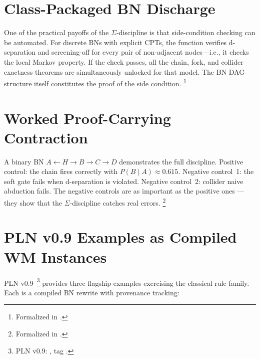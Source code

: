 \documentclass[11pt,openany]{report}
\begin{document}


\section{Class-Packaged BN Discharge}

One of the practical payoffs of the $\Sigma$-discipline is that
side-condition checking can be automated.  For discrete BNs with
explicit CPTs, the function
 verifies d-separation and
screening-off for every pair of non-adjacent nodes---i.e., it
checks the local Markov property.  If the check passes, all the
chain, fork, and collider exactness theorems are simultaneously
unlocked for that model.  The BN DAG structure itself constitutes
the proof of the side condition.%
\footnote{Formalized in
.}


\section{Worked Proof-Carrying Contraction}

A binary BN $A \leftarrow H \to B \to C \to D$ demonstrates the full
discipline.  Positive control: the chain fires correctly with
$P(B \mid A) \approx 0.615$.  Negative control~1: the soft gate
fails when d-separation is violated.  Negative control~2: collider
naive abduction fails.  The negative controls are as important as
the positive ones --- they show that the $\Sigma$-discipline catches
real errors.%
\footnote{Formalized in
.}


\section{PLN v0.9 Examples as Compiled WM Instances}

PLN v0.9~\cite{goertzel2009pln}\footnote{PLN v0.9:
, tag .} provides
three flagship examples exercising the classical rule family.  Each
is a compiled BN rewrite with provenance tracking:
\end{document}
